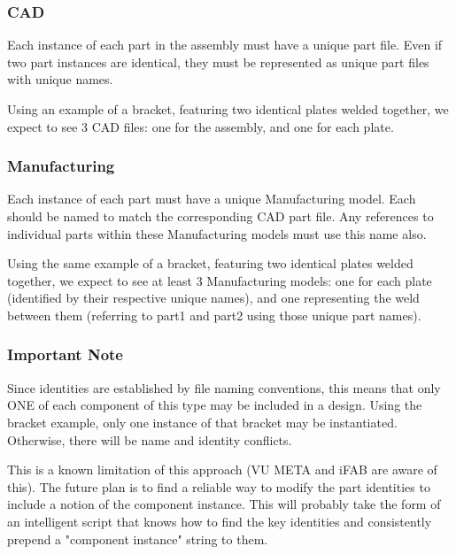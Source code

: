 \subsubsection{CAD}
Each instance of each part in the assembly must have a unique part file. Even if two part instances are identical, they must be represented as unique part files with unique names.

Using an example of a bracket, featuring two identical plates welded together, we expect to see 3 CAD files: one for the assembly, and one for each plate.

\subsubsection{Manufacturing}
Each instance of each part must have a unique Manufacturing model. Each should be named to match the corresponding CAD part file. Any references to individual parts within these Manufacturing models must use this name also.

Using the same example of a bracket, featuring two identical plates welded together, we expect to see at least 3 Manufacturing models: one for each plate (identified by their respective unique names), and one representing the weld between them (referring to part1 and part2 using those unique part names).

\subsubsection{Important Note}
Since identities are established by file naming conventions, this means that only ONE of each component of this type may be included in a design. Using the bracket example, only one instance of that bracket may be instantiated. Otherwise, there will be name and identity conflicts.

This is a known limitation of this approach (VU META and iFAB are aware of this). The future plan is to find a reliable way to modify the part identities to include a notion of the component instance. This will probably take the form of an intelligent script that knows how to find the key identities and consistently prepend a "component instance" string to them.


